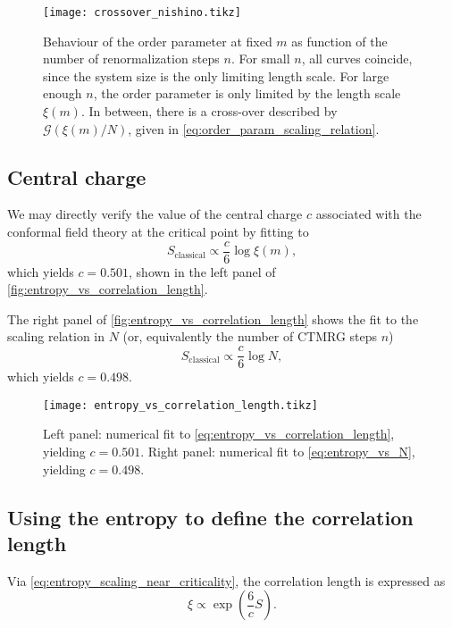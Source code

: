 \begin{figure}
  \texttt{[image: crossover\_nishino.tikz]}
  \caption{Behaviour of the order parameter at fixed $m$ as function of
  the number of renormalization steps $n$. For small $n$, all curves coincide, since the system size is the only
  limiting length scale. For large enough $n$, the order parameter is only limited by the length scale
  $\xi(m)$. In between, there is a cross-over described by $\mathcal{G}(\xi(m)/N)$, given in
  \autoref{eq:order_param_scaling_relation}.}\label{fig:crossover_nishino}
\end{figure}

\subsection{Central charge}
We may directly verify the value of the central charge $c$ associated with the conformal field theory at the critical
point by fitting to
\begin{equation}\label{eq:entropy_vs_correlation_length}
  S_{\text{classical}} \propto \frac{c}{6} \log \xi(m),
\end{equation}
which yields $c = 0.501$, shown in the left panel of \autoref{fig:entropy_vs_correlation_length}.

The right panel of \autoref{fig:entropy_vs_correlation_length} shows the fit to the scaling relation in $N$ (or,
equivalently the number of CTMRG steps $n$)
\begin{equation}\label{eq:entropy_vs_N}
  S_{\text{classical}} \propto \frac{c}{6} \log N,
\end{equation}
which yields $c = 0.498$.

\begin{figure}
  \texttt{[image: entropy\_vs\_correlation\_length.tikz]}
  \caption{Left panel: numerical fit to \autoref{eq:entropy_vs_correlation_length}, yielding $c = 0.501$. Right panel:
  numerical fit to \autoref{eq:entropy_vs_N}, yielding $c = 0.498$. }\label{fig:entropy_vs_correlation_length}
\end{figure}

\subsection{Using the entropy to define the correlation length}\label{sec:entropy_to_define_correlation_length}
Via \autoref{eq:entropy_scaling_near_criticality}, the correlation length is expressed as
\begin{equation}\label{eq:correlation_length_as_function_of_entropy}
  \xi \propto \exp(\frac{6}{c}S).
\end{equation}

